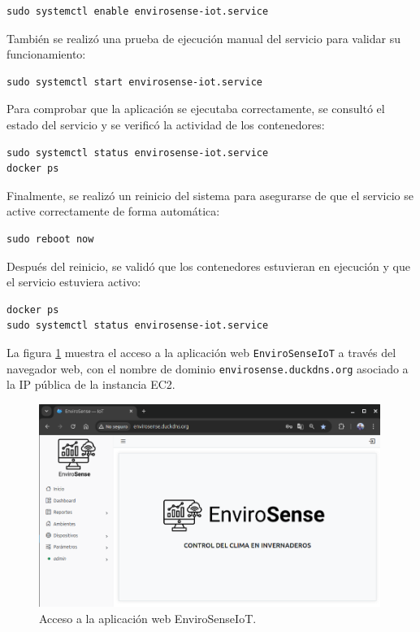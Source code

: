 \begin{verbatim}
sudo systemctl enable envirosense-iot.service
\end{verbatim}

También se realizó una prueba de ejecución manual del servicio para validar su
funcionamiento:

\begin{verbatim}
sudo systemctl start envirosense-iot.service
\end{verbatim}

Para comprobar que la aplicación se ejecutaba correctamente, se consultó el
estado del servicio y se verificó la actividad de los contenedores:

\begin{verbatim}
sudo systemctl status envirosense-iot.service
docker ps
\end{verbatim}

Finalmente, se realizó un reinicio del sistema para asegurarse de que el
servicio se active correctamente de forma automática:

\begin{verbatim}
sudo reboot now
\end{verbatim}

Después del reinicio, se validó que los contenedores estuvieran en ejecución y
que el servicio estuviera activo:

\begin{verbatim}
docker ps
sudo systemctl status envirosense-iot.service
\end{verbatim}

La figura \ref{fig:aws-ec2-service} muestra el acceso a la aplicación web
\texttt{EnviroSenseIoT} a través del navegador web, con el nombre de dominio
\texttt{envirosense.duckdns.org} asociado a la IP pública de la instancia EC2.
\begin{figure}[H]
    \centering
    \includegraphics[width=0.99\textwidth]{./Images/34-ec2-3.png}
    \caption{Acceso a la aplicación web EnviroSenseIoT.}
    \label{fig:aws-ec2-service}
\end{figure}

